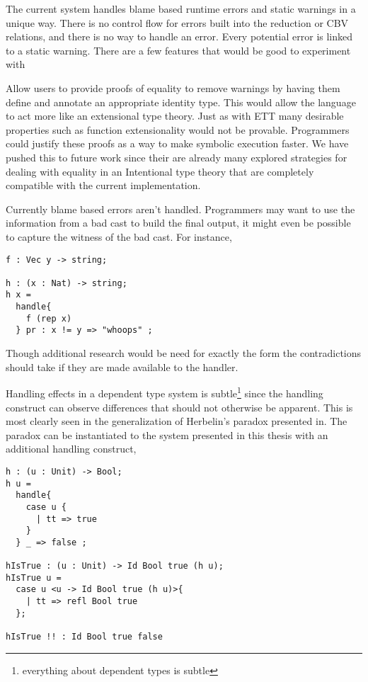 The current system handles blame based runtime errors and static warnings
in a unique way. There is no control flow for errors built into the
reduction or CBV relations, and there is no way to handle an error.
Every potential error is linked to a static warning. There are a few
features that would be good to experiment with

Allow users to provide proofs of equality to remove warnings by having
them define and annotate an appropriate identity type. This would
allow the language to act more like an extensional type theory. Just
as with ETT many desirable properties such as function extensionality
would not be provable. Programmers could justify these proofs as a
way to make symbolic execution faster. We have pushed this to future
work since their are already many explored strategies for dealing
with equality in an Intentional type theory that are completely compatible
with the current implementation.

Currently blame based errors aren't handled. Programmers may want
to use the information from a bad cast to build the final output,
it might even be possible to capture the witness of the bad cast.
For instance,

\begin{lstlisting}
f : Vec y -> string;

h : (x : Nat) -> string;
h x =
  handle{
    f (rep x)
  } pr : x != y => "whoops" ;
\end{lstlisting}

Though additional research would be need for exactly the form the
contradictions should take if they are made available to the handler.

Handling effects in a dependent type system is subtle\footnote{everything about dependent types is subtle}
since the handling construct can observe differences that should not
otherwise be apparent. This is most clearly seen in the generalization
of Herbelin's paradox presented in\cite{pedrot2020fire}.
The paradox can be instantiated to the system presented in this thesis
with an additional handling construct,

\begin{lstlisting}
h : (u : Unit) -> Bool;
h u =
  handle{
    case u {
      | tt => true
    }
  } _ => false ;

hIsTrue : (u : Unit) -> Id Bool true (h u);
hIsTrue u =
  case u <u -> Id Bool true (h u)>{
    | tt => refl Bool true
  };

hIsTrue !! : Id Bool true false
\end{lstlisting}

